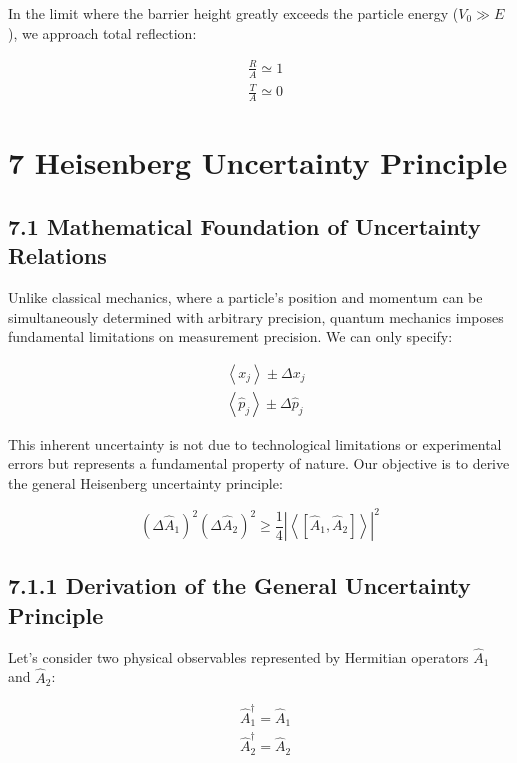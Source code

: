 \documentclass[10pt]{article}
\begin{document}
In the limit where the barrier height greatly exceeds the particle energy ($V_0 \gg E$), we approach total reflection:

\begin{align*}
& \frac{R}{A} \simeq 1  \tag{6.80}\\
& \frac{T}{A} \simeq 0
\end{align*}

\section*{7 Heisenberg Uncertainty Principle}
\subsection*{7.1 Mathematical Foundation of Uncertainty Relations}

Unlike classical mechanics, where a particle's position and momentum can be simultaneously determined with arbitrary precision, quantum mechanics imposes fundamental limitations on measurement precision. We can only specify:

\begin{align*}
& \left\langle x_{j}\right\rangle \pm \Delta x_{j} \\
& \left\langle\hat{p}_{j}\right\rangle \pm \Delta \hat{p}_{j} \tag{7.1}
\end{align*}

This inherent uncertainty is not due to technological limitations or experimental errors but represents a fundamental property of nature. Our objective is to derive the general Heisenberg uncertainty principle:

\begin{equation*}
\left(\Delta \hat{A}_{1}\right)^{2}\left(\Delta \hat{A}_{2}\right)^{2} \geq \frac{1}{4}\left|\left\langle\left[\hat{A}_{1}, \hat{A}_{2}\right]\right\rangle\right|^{2} \tag{7.2}
\end{equation*}


\subsection*{7.1.1 Derivation of the General Uncertainty Principle}

Let's consider two physical observables represented by Hermitian operators $\hat{A}_1$ and $\hat{A}_2$:

\begin{align*}
& \hat{A}_{1}^{\dagger}=\hat{A}_{1} \\
& \hat{A}_{2}^{\dagger}=\hat{A}_{2} \tag{7.3}
\end{align*}
\end{document}
